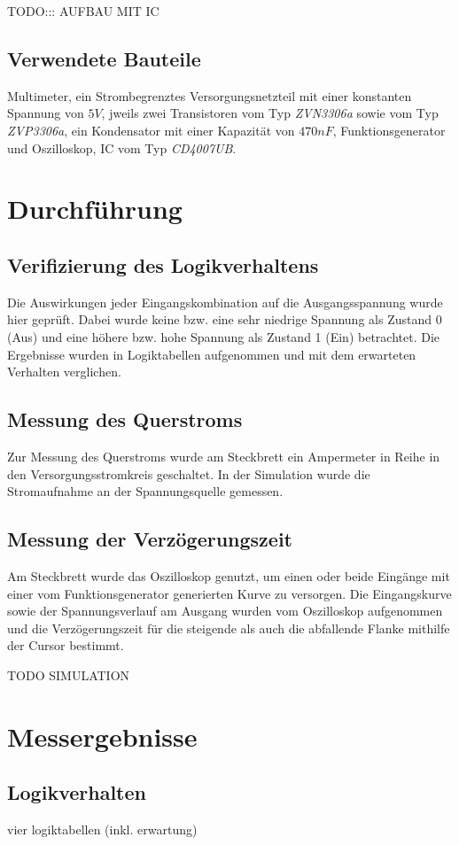 \documentclass[11pt, a4paper]{article}
\begin{document}
TODO::: AUFBAU MIT IC

\subsection*{Verwendete Bauteile}
Multimeter, ein Strombegrenztes Versorgungsnetzteil mit einer konstanten Spannung von $5V$, jweils zwei Transistoren vom Typ \textit{ZVN3306a} sowie vom Typ \textit{ZVP3306a}, ein Kondensator mit einer Kapazität von $470nF$, Funktionsgenerator und Oszilloskop, IC vom Typ \textit{CD4007UB}.
\section*{Durchführung}
\subsection*{Verifizierung des Logikverhaltens}
Die Auswirkungen jeder Eingangskombination auf die Ausgangsspannung wurde hier geprüft. Dabei wurde keine bzw. eine sehr niedrige Spannung als Zustand 0 (Aus) und eine höhere bzw. hohe Spannung als Zustand 1 (Ein) betrachtet. Die Ergebnisse wurden in Logiktabellen aufgenommen und mit dem erwarteten Verhalten verglichen.
\subsection*{Messung des Querstroms}
Zur Messung des Querstroms wurde am Steckbrett ein Ampermeter in Reihe in den Versorgungsstromkreis geschaltet. In der Simulation wurde die Stromaufnahme an der Spannungsquelle gemessen.
\subsection*{Messung der Verzögerungszeit}
Am Steckbrett wurde das Oszilloskop genutzt, um einen oder beide Eingänge mit einer vom Funktionsgenerator generierten Kurve zu versorgen. Die Eingangskurve sowie der Spannungsverlauf am Ausgang wurden vom Oszilloskop aufgenommen und die Verzögerungszeit für die steigende als auch die abfallende Flanke mithilfe der Cursor bestimmt.

TODO SIMULATION
\section*{Messergebnisse}
\subsection*{Logikverhalten}
vier logiktabellen (inkl. erwartung)
\end{document}
